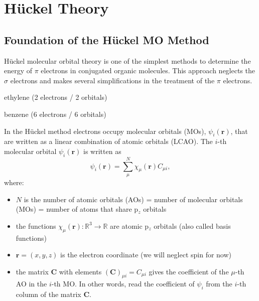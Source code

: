 \documentclass[../Main/chem532-notes.tex]{subfiles}
\begin{document}
\chapter{H\"{u}ckel Theory}

\section{Foundation of the H\"{u}ckel MO Method}
H\"{u}ckel molecular orbital theory is one of the simplest methods to determine the energy of $\pi$ electrons in conjugated organic molecules. This approach neglects the $\sigma$ electrons and makes several simplifications in the treatment of the $\pi$ electrons.

\begin{example}
ethylene (2 electrons / 2 orbitals)
\end{example}

\begin{example}
benzene (6 electrons / 6 orbitals)
\end{example}

In the H\"{u}ckel method electrons occupy molecular orbitals (MOs), $\psi_i(\mathbf{r})$, that are written as a linear combination of atomic orbitals (LCAO).
The $i$-th molecular orbital $\psi_i(\mathbf{r})$ is written as
\begin{equation}
\psi_i(\mathbf{r}) = \sum_\mu^{N} \chi_\mu(\mathbf{r}) C_{\mu i},
\end{equation}
where:
\begin{itemize}
\item  $N$ is the number of atomic orbitals (AOs) = number of molecular orbitals (MOs) = number of atoms that share p$_z$ orbitals
\item  the functions $\chi_\mu(\mathbf{r}): \mathbb{R}^3 \rightarrow \mathbb{R}$ are atomic p$_z$ orbitals (also called basis functions)
\item  $\mathbf{r} = (x,y,z)$ is the electron coordinate (we will neglect spin for now)
\item the matrix $\mathbf{C}$ with elements $(\mathbf{C})_{\mu i} = C_{\mu i}$ gives the coefficient of the $\mu$-th AO in the $i$-th MO. In other words, read the coefficient of $\psi_i$ from the $i$-th column of the matrix $\mathbf{C}$.
\end{itemize}
\end{document}
